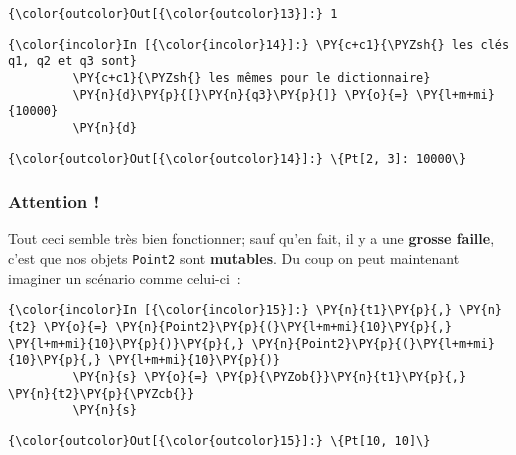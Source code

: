 \begin{Verbatim}[commandchars=\\\{\},frame=single,framerule=0.3mm,rulecolor=\color{cellframecolor}]
{\color{outcolor}Out[{\color{outcolor}13}]:} 1
\end{Verbatim}
            
    \begin{Verbatim}[commandchars=\\\{\},frame=single,framerule=0.3mm,rulecolor=\color{cellframecolor}]
{\color{incolor}In [{\color{incolor}14}]:} \PY{c+c1}{\PYZsh{} les clés q1, q2 et q3 sont}
         \PY{c+c1}{\PYZsh{} les mêmes pour le dictionnaire}
         \PY{n}{d}\PY{p}{[}\PY{n}{q3}\PY{p}{]} \PY{o}{=} \PY{l+m+mi}{10000}
         \PY{n}{d}
\end{Verbatim}


\begin{Verbatim}[commandchars=\\\{\},frame=single,framerule=0.3mm,rulecolor=\color{cellframecolor}]
{\color{outcolor}Out[{\color{outcolor}14}]:} \{Pt[2, 3]: 10000\}
\end{Verbatim}
            
    \hypertarget{attention}{%
\subsubsection{Attention !}\label{attention}}

    Tout ceci semble très bien fonctionner; sauf qu'en fait, il y a une
\textbf{grosse faille}, c'est que nos objets \texttt{Point2} sont
\textbf{mutables}. Du coup on peut maintenant imaginer un scénario comme
celui-ci~:

    \begin{Verbatim}[commandchars=\\\{\},frame=single,framerule=0.3mm,rulecolor=\color{cellframecolor}]
{\color{incolor}In [{\color{incolor}15}]:} \PY{n}{t1}\PY{p}{,} \PY{n}{t2} \PY{o}{=} \PY{n}{Point2}\PY{p}{(}\PY{l+m+mi}{10}\PY{p}{,} \PY{l+m+mi}{10}\PY{p}{)}\PY{p}{,} \PY{n}{Point2}\PY{p}{(}\PY{l+m+mi}{10}\PY{p}{,} \PY{l+m+mi}{10}\PY{p}{)}
         \PY{n}{s} \PY{o}{=} \PY{p}{\PYZob{}}\PY{n}{t1}\PY{p}{,} \PY{n}{t2}\PY{p}{\PYZcb{}}
         \PY{n}{s}
\end{Verbatim}


\begin{Verbatim}[commandchars=\\\{\},frame=single,framerule=0.3mm,rulecolor=\color{cellframecolor}]
{\color{outcolor}Out[{\color{outcolor}15}]:} \{Pt[10, 10]\}
\end{Verbatim}
            
